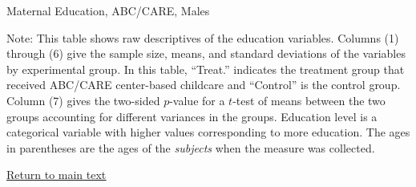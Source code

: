 \documentclass[static]{JJH-Beamer}
\begin{document}
\begin{frame}
 \addtocounter{framenumber}{-1}

\begin{table}[H]
\caption{Maternal Education, ABC/CARE, Males}\label{tab:meducation-males}
\vspace{-4mm}
\begin{center}
\resizebox{\textwidth}{!}{

}
\end{center}
\end{table}
{\flushleft \tiny Note: This table shows raw descriptives of the education variables. Columns (1) through (6) give the sample size, means, and standard deviations of the variables by experimental group. In this table, ``Treat.'' indicates the treatment group that received ABC/CARE center-based childcare and ``Control'' is the control group. Column (7) gives the two-sided $p$-value for a $t$-test of means between the two groups accounting for different variances in the groups. Education level is a categorical variable with higher values corresponding to more education. The ages in parentheses are the ages of the \textit{subjects} when the measure was collected.\\}

\end{frame}

\begin{frame}
 \addtocounter{framenumber}{-1}

\begin{center}
\hyperlink{ret:gum}{\underline{Return to main text}}
\end{center}

\end{frame}
\end{document}
